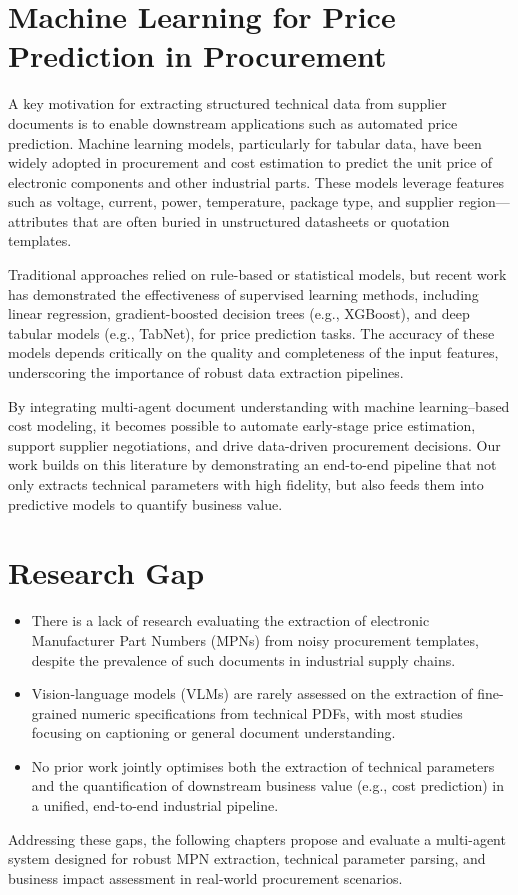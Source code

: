 \section{Machine Learning for Price Prediction in Procurement}
A key motivation for extracting structured technical data from supplier documents is to enable downstream applications such as automated price prediction. Machine learning models, particularly for tabular data, have been widely adopted in procurement and cost estimation to predict the unit price of electronic components and other industrial parts. These models leverage features such as voltage, current, power, temperature, package type, and supplier region—attributes that are often buried in unstructured datasheets or quotation templates.

Traditional approaches relied on rule-based or statistical models, but recent work has demonstrated the effectiveness of supervised learning methods, including linear regression, gradient-boosted decision trees (e.g., XGBoost), and deep tabular models (e.g., TabNet), for price prediction tasks. The accuracy of these models depends critically on the quality and completeness of the input features, underscoring the importance of robust data extraction pipelines.

By integrating multi-agent document understanding with machine learning–based cost modeling, it becomes possible to automate early-stage price estimation, support supplier negotiations, and drive data-driven procurement decisions. Our work builds on this literature by demonstrating an end-to-end pipeline that not only extracts technical parameters with high fidelity, but also feeds them into predictive models to quantify business value.

\section{Research Gap}
\begin{itemize}
  \item There is a lack of research evaluating the extraction of electronic Manufacturer Part Numbers (MPNs) from noisy procurement templates, despite the prevalence of such documents in industrial supply chains.
  \item Vision-language models (VLMs) are rarely assessed on the extraction of fine-grained numeric specifications from technical PDFs, with most studies focusing on captioning or general document understanding.
  \item No prior work jointly optimises both the extraction of technical parameters and the quantification of downstream business value (e.g., cost prediction) in a unified, end-to-end industrial pipeline.
\end{itemize}
Addressing these gaps, the following chapters propose and evaluate a multi-agent system designed for robust MPN extraction, technical parameter parsing, and business impact assessment in real-world procurement scenarios.
